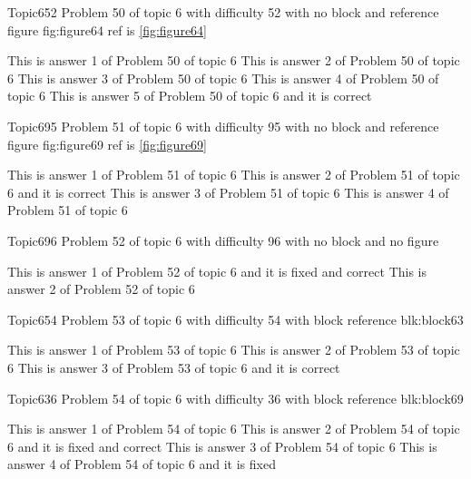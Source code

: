 \documentclass[master]{exam}
\begin{document}
\begin{problem}{Topic6}{52}
	Problem 50 of topic 6 with difficulty 52 with no block and reference figure fig:figure64 ref is \ref{fig:figure64}
	\begin{answers}
		\answer This is answer 1 of Problem 50 of topic 6 
		\answer This is answer 2 of Problem 50 of topic 6 
		\answer This is answer 3 of Problem 50 of topic 6 
		\answer This is answer 4 of Problem 50 of topic 6 
		\answer[correct] This is answer 5 of Problem 50 of topic 6 and it is correct
	\end{answers}
\end{problem}

\begin{problem}{Topic6}{95}
	Problem 51 of topic 6 with difficulty 95 with no block and reference figure fig:figure69 ref is \ref{fig:figure69}
	\begin{answers}
		\answer This is answer 1 of Problem 51 of topic 6 
		\answer[correct] This is answer 2 of Problem 51 of topic 6 and it is correct
		\answer This is answer 3 of Problem 51 of topic 6 
		\answer This is answer 4 of Problem 51 of topic 6 
	\end{answers}
\end{problem}

\begin{problem}{Topic6}{96}
	Problem 52 of topic 6 with difficulty 96 with no block and no figure
	\begin{answers}
		 This is answer 1 of Problem 52 of topic 6 and it is fixed and correct
		\answer This is answer 2 of Problem 52 of topic 6 
	\end{answers}
\end{problem}

\begin{problem}[requires=blk:block63]{Topic6}{54}
	Problem 53 of topic 6 with difficulty 54 with block reference blk:block63
	\begin{answers}
		\answer This is answer 1 of Problem 53 of topic 6 
		\answer This is answer 2 of Problem 53 of topic 6 
		\answer[correct] This is answer 3 of Problem 53 of topic 6 and it is correct
	\end{answers}
\end{problem}

\begin{problem}[requires=blk:block69]{Topic6}{36}
	Problem 54 of topic 6 with difficulty 36 with block reference blk:block69
	\begin{answers}
		\answer This is answer 1 of Problem 54 of topic 6 
		 This is answer 2 of Problem 54 of topic 6 and it is fixed and correct
		\answer This is answer 3 of Problem 54 of topic 6 
		\answer[fixed] This is answer 4 of Problem 54 of topic 6 and it is fixed
	\end{answers}
\end{problem}
\end{document}
